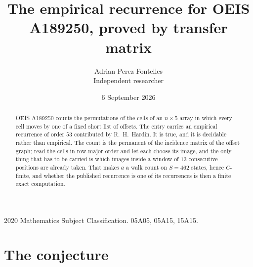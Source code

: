 \documentclass[11pt,a4paper]{article}
\title{The empirical recurrence for OEIS A189250, proved by transfer matrix}
\author{Adrian Perez Fontelles\\ \small Independent researcher}
\date{6 September 2026}
\theoremstyle{plain}
\theoremstyle{definition}
\begin{document}
\maketitle

\begin{abstract}
OEIS A189250 counts the permutations of the cells of an $n\times5$ array in which every cell
moves by one of a fixed short list of offsets. The entry carries an empirical recurrence of
order $53$ contributed by R.~H.~Hardin. It is true, and it is decidable rather than
empirical. The count is the permanent of the incidence matrix of the offset graph; read the
cells in row-major order and let each choose its image, and the only thing that has to be
carried is which images inside a window of $13$ consecutive positions are already taken.
That makes $a$ a walk count on $S=462$ states, hence $C$-finite, and whether the published
recurrence is one of its recurrences is then a finite exact computation.
\end{abstract}

\noindent\small 2020 Mathematics Subject Classification. 05A05, 05A15, 15A15.\normalsize

\section{The conjecture}
\end{document}
